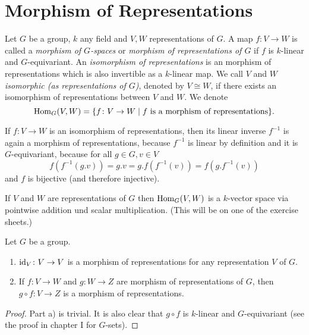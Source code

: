 \section{Morphism of Representations}


\begin{defi}
Let $G$ be a group, $k$ any field and $V,W$ representations of $G$.
A map $f \colon V \to W$ is called a \emph{morphism of $G$-spaces} or \emph{morphism of representations of $G$} if $f$ is $k$-linear and $G$-equivariant.
An \emph{isomorphism of representations} is an morphism of representations which is also invertible as a $k$-linear map.
We call $V$ and $W$ \emph{isomorphic (as representations of $G$)}, denoted by $V \cong W$, if there exists an isomorphism of representations between $V$ and $W$.
We denote
\[
    \operatorname{Hom}_G(V,W)
  = \{
      f \colon V \to W
    \mid
      f \text{ is a morphism of representations}
    \}.
\]
\end{defi}


\begin{rem}
  If $f \colon V \to W$ is an isomorphism of representations, then its linear inverse $f^{-1}$ is again a morphism of representations, because $f^{-1}$ is linear by definition and it is $G$-equivariant, because for all $g \in G, v \in V$
  \[
      f\left( f^{-1}(g.v) \right)
    = g.v
    = g.f\left( f^{-1}(v) \right)
    = f\left( g.f^{-1}(v) \right)
  \]
  and $f$ is bijective (and therefore injective).
\end{rem}


\begin{rem}
  If $V$ and $W$ are representations of $G$ then $\operatorname{Hom}_G(V,W)$ is a $k$-vector space via pointwise addition und scalar multiplication.
  (This will be on one of the exercise sheets.)
\end{rem}


\begin{lem}\label{lem: composition of morphisms of representations}
  Let $G$ be a group.
  \begin{enumerate}[label=\emph{\alph*)},leftmargin=*]
    \item
      $\operatorname{id}_V \colon V \to V$ is a morphism of representations for any representation $V$ of $G$.
    \item
      If $f \colon V \to W$  and $g \colon W \to Z$ are morphism of representations of $G$, then $g \circ f \colon V \to Z$ is a morphism of representations.
  \end{enumerate}
\end{lem}
\begin{proof}
  Part a) is trivial.
  It is also clear that $g \circ f$ is $k$-linear and $G$-equivariant (see the proof in chapter I for $G$-sets).
\end{proof}


